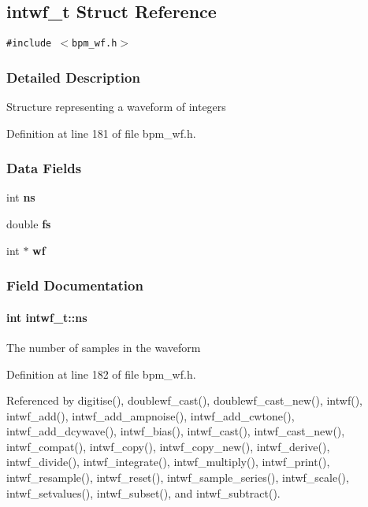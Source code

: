 \subsection{intwf\_\-t Struct Reference}
\label{structintwf__t}
{\tt \#include $<$bpm\_\-wf.h$>$}



\subsubsection{Detailed Description}
Structure representing a waveform of integers 

Definition at line 181 of file bpm\_\-wf.h.\subsubsection*{Data Fields}
\begin{CompactItemize}
\item 
int {\bf ns}
\item 
double {\bf fs}
\item 
int $\ast$ {\bf wf}
\end{CompactItemize}


\subsubsection{Field Documentation}
\paragraph[ns]{\setlength{\rightskip}{0pt plus 5cm}int {\bf intwf\_\-t::ns}}\hfill\label{structintwf__t_803ea4f9dabd4fb7c7f5bb331f6525f1}


The number of samples in the waveform 

Definition at line 182 of file bpm\_\-wf.h.

Referenced by digitise(), doublewf\_\-cast(), doublewf\_\-cast\_\-new(), intwf(), intwf\_\-add(), intwf\_\-add\_\-ampnoise(), intwf\_\-add\_\-cwtone(), intwf\_\-add\_\-dcywave(), intwf\_\-bias(), intwf\_\-cast(), intwf\_\-cast\_\-new(), intwf\_\-compat(), intwf\_\-copy(), intwf\_\-copy\_\-new(), intwf\_\-derive(), intwf\_\-divide(), intwf\_\-integrate(), intwf\_\-multiply(), intwf\_\-print(), intwf\_\-resample(), intwf\_\-reset(), intwf\_\-sample\_\-series(), intwf\_\-scale(), intwf\_\-setvalues(), intwf\_\-subset(), and intwf\_\-subtract().
